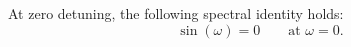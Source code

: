 \documentclass{article}
\begin{document}
At zero detuning, the following spectral identity holds:
\begin{equation}
\sin(\omega)=0 \qquad \text{at } \omega=0 .\label{at-zero}
\end{equation}
\end{document}
